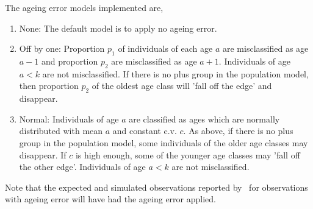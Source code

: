 The ageing error models implemented are,
\begin{enumerate}
	\item{None}: The default model is to apply no ageing error.
	\item{Off by one}: Proportion $p_1$ of individuals of each age $a$ are misclassified as age $a-1$ and proportion $p_2$ are misclassified as age $a+1$. Individuals of age $a < k$ are not misclassified. If there is no plus group in the population model, then proportion $p_2$ of the oldest age class will 'fall off the edge' and disappear. 
	\item{Normal}: Individuals of age $a$ are classified as ages which are normally distributed with mean $a$ and constant c.v. $c$. As above, if there is no plus group in the population model, some individuals of the older age classes may disappear. If $c$ is high enough, some of the younger age classes may 'fall off the other edge'. Individuals of age $a < k$ are not misclassified.
\end{enumerate}

Note that the expected and simulated observations reported by \IBM\ for observations with ageing error will have had the ageing error applied. 



